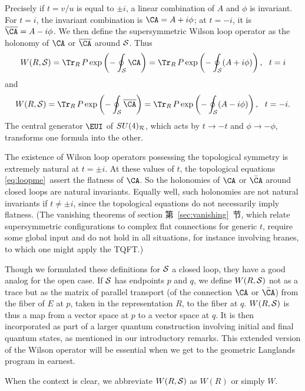 Precisely if $t=v/u$ is equal to $\pm i$, a linear combination of
$A$ and $\phi$ is invariant.  For $t=i$, the invariant combination
is $\CA=A+i\phi$; at $t=-i$, it is $\overline\CA=A-i\phi$.  We
then define the supersymmetric Wilson loop operator as the
holonomy of $\CA$ or $\overline\CA$ around ${\cal S}$.  Thus
\setcounter{equation}{3}
\begin{equation}\label{eq:ymop}
W(R,{\cal S})=\Tr_R\,P\exp\left(-\oint_{{\cal
S}}\CA\right)=\Tr_R\,P\exp\left(-\oint_{{\cal
S}}(A+i\phi)\right),~~ t=i
\end{equation}
 and %
\setcounter{equation}{4}
\begin{equation}\label{eq:jymop}
W(R,{{\cal S}})=
\Tr_R\,P\exp\left(-\oint_{{\cal S}}{\overline\CA}\right)
=\Tr_R\,P\exp\left(-\oint_{{\cal S}}(A-i\phi)\right), ~~t=-i.
\end{equation}
 The
central generator $\EUI$ of $SU(4)_{{\cal R}}$, which acts by
$t\to -t$ and $\phi\to -\phi$, transforms one formula into the
other.

The existence of Wilson loop operators possessing the topological
symmetry is extremely natural at $t=\pm i$.  At these values of
$t$, the topological equations \eqref{eq:loopme}\ assert the flatness of
$\CA$. So the holonomies  of $\CA$ or $\bar\CA$ around closed
loops are natural invariants. Equally well, such  holonomies are
not natural invariants if $t\not=\pm i$, since the topological
equations do not necessarily imply flatness.  (The vanishing
theorems of section 第~\ref{sec:vanishing}~节, which relate supersymmetric
configurations to complex flat connections for generic $t$,
require some global input and do not hold in all situations, for
instance involving branes, to which one might apply the TQFT.)

Though we formulated these definitions for ${{\cal S}}$ a closed
loop, they have a good analog for the open case. If ${{\cal S}}$
has endpoints $p$ and $q$, we define $W(R,{{\cal S}})$ not  as a
trace but as the matrix of parallel transport (of the connection
$\CA$ or $\bar\CA$) from the fiber of $E$ at $p$, taken in the
representation $R$, to the fiber at $q$. $W(R,{{\cal S}})$ is thus
a map from a vector space at $p$ to a vector space at $q$.  It is
then incorporated as part of a larger quantum construction
involving initial and final quantum states, as mentioned in our
introductory remarks. This extended version of the Wilson operator
will be essential when we get to the geometric Langlands program
in earnest.

  When the
context is clear, we abbreviate $W(R,{{\cal S}})$ as $W(R)$ or
simply $W$.
